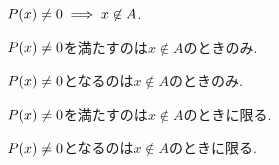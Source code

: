 \item $P(x)\neq 0\implies x\not\in A$.
\item $P(x)\neq 0$を満たすのは$x\not\in A$のときのみ.
\item $P(x)\neq 0$となるのは$x\not\in A$のときのみ.
\item $P(x)\neq 0$を満たすのは$x\not\in A$のときに限る.
\item $P(x)\neq 0$となるのは$x\not\in A$のときに限る.
